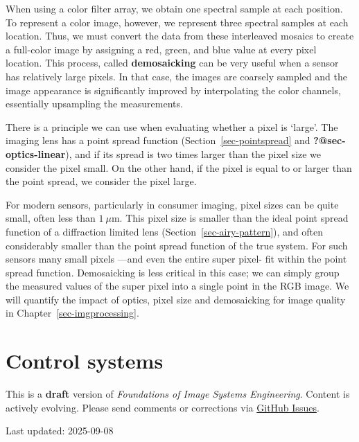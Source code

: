 \documentclass[
  letterpaper,
]{book}
\begin{document}
When using a color filter array, we obtain one spectral sample at each
position. To represent a color image, however, we represent three
spectral samples at each location. Thus, we must convert the data from
these interleaved mosaics to create a full-color image by assigning a
red, green, and blue value at every pixel location. This process, called
\textbf{demosaicking} can be very useful when a sensor has relatively
large pixels. In that case, the images are coarsely sampled and the
image appearance is significantly improved by interpolating the color
channels, essentially upsampling the measurements.

There is a principle we can use when evaluating whether a pixel is
`large'. The imaging lens has a point spread function
(Section~\ref{sec-pointspread} and \textbf{?@sec-optics-linear}), and if
its spread is two times larger than the pixel size we consider the pixel
small. On the other hand, if the pixel is equal to or larger than the
point spread, we consider the pixel large.

For modern sensors, particularly in consumer imaging, pixel sizes can be
quite small, often less than \(1~\mu \text{m}\). This pixel size is
smaller than the ideal point spread function of a diffraction limited
lens (Section~\ref{sec-airy-pattern}), and often considerably smaller
than the point spread function of the true system. For such sensors many
small pixels ---and even the entire super pixel- fit within the point
spread function. Demosaicking is less critical in this case; we can
simply group the measured values of the super pixel into a single point
in the RGB image. We will quantify the impact of optics, pixel size and
demosaicking for image quality in Chapter~\ref{sec-imgprocessing}.

\chapter{Control systems}\label{sec-sensor-control}

\begin{tcolorbox}[enhanced jigsaw, colframe=quarto-callout-warning-color-frame, titlerule=0mm, rightrule=.15mm, opacitybacktitle=0.6, colback=white, leftrule=.75mm, coltitle=black, title=\textcolor{quarto-callout-warning-color}{\faExclamationTriangle}\hspace{0.5em}{Work in Progress}, bottomrule=.15mm, colbacktitle=quarto-callout-warning-color!10!white, breakable, left=2mm, bottomtitle=1mm, toptitle=1mm, opacityback=0, arc=.35mm, toprule=.15mm]

This is a \textbf{draft} version of \emph{Foundations of Image Systems
Engineering}. Content is actively evolving. Please send comments or
corrections via \href{https://github.com/wandell/FISE-git/issues}{GitHub
Issues}.

Last updated: 2025-09-08

\end{tcolorbox}
\end{document}
